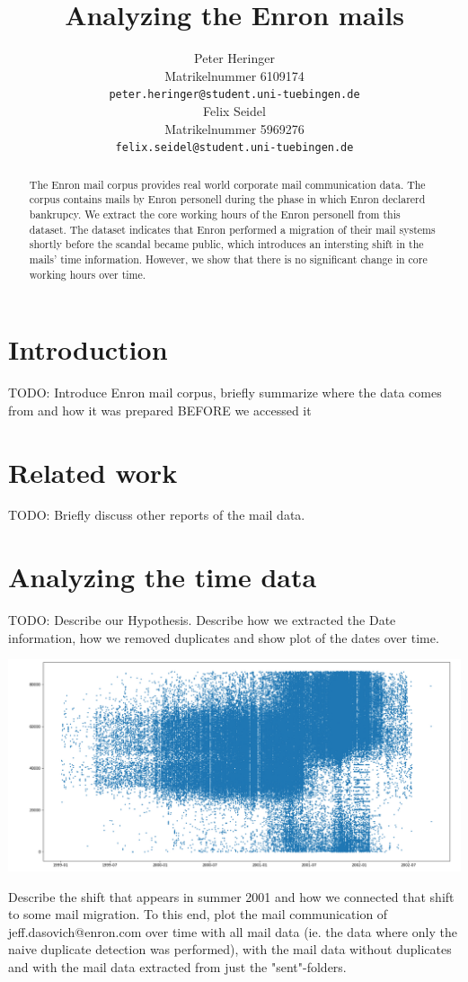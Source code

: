 \documentclass{article}
\title{Analyzing the Enron mails}
\author{%
  Peter Heringer\\
  Matrikelnummer 6109174 \\
  \texttt{peter.heringer@student.uni-tuebingen.de} \\
  \And
  Felix Seidel\\
  Matrikelnummer 5969276 \\
  \texttt{felix.seidel@student.uni-tuebingen.de} \\
}
\begin{document}
\maketitle

\begin{abstract}
  The Enron mail corpus provides real world corporate mail communication data. 
  The corpus contains mails by Enron personell during the phase in which Enron 
  declarerd bankrupcy. We extract the core working hours of the Enron personell 
  from this dataset. The dataset indicates that Enron performed a migration 
  of their mail systems shortly before the scandal became public, which
  introduces an intersting shift in the mails' time information. However, we
  show that there is no significant change in core working hours over time.
\end{abstract}

\section{Introduction}
TODO: Introduce Enron mail corpus, briefly summarize where the data comes from
and how it was prepared BEFORE we accessed it

\section{Related work}
TODO: Briefly discuss other reports of the mail data.

\section{Analyzing the time data}
TODO: Describe our Hypothesis. Describe how we extracted the Date information, 
how we removed duplicates and show plot of the dates over time.

\begin{center}
  \includegraphics[width=0.7\linewidth]{tmp/plot_all_mail.png}
\end{center}

Describe the shift that appears in summer 2001
and how we connected that shift to some mail migration. To this end, plot the
mail communication of jeff.dasovich@enron.com over time with all mail data (ie.
the data where only the naive duplicate detection was performed), with the mail
data without duplicates and with the mail data extracted from just the
"sent"-folders.
\end{document}
